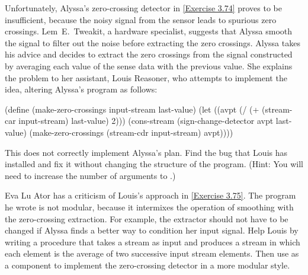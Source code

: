 \begin{exercise}
	\label{Exercise 3.75}
	Unfortunately, Alyssa’s zero-crossing detector in \cref{Exercise 3.74} proves to be insufficient, because the noisy signal from the sensor leads to spurious zero crossings.
	Lem~E.~Tweakit, a hardware specialist, suggests that Alyssa smooth the signal to filter out the noise before extracting the zero crossings.
	Alyssa takes his advice and decides to extract the zero crossings from the signal constructed by averaging each value of the sense data with the previous value.
	She explains the problem to her assistant, Louis Reasoner, who attempts to implement the idea, altering Alyssa’s program as follows:
	\begin{scheme}
	  (define (make-zero-crossings input-stream last-value)
	    (let ((avpt (/ (+ (stream-car input-stream)
	                      last-value)
	                   2)))
	      (cons-stream
	       (sign-change-detector avpt last-value)
	       (make-zero-crossings
	        (stream-cdr input-stream) avpt))))
	\end{scheme}
	This does not correctly implement Alyssa’s plan.
	Find the bug that Louis has installed and fix it without changing the structure of the program.
	(Hint:
	You will need to increase the number of arguments to .)
\end{exercise}



\begin{exercise}
	\label{Exercise 3.76}
	Eva Lu Ator has a criticism of Louis’s approach in \cref{Exercise 3.75}.
	The program he wrote is not modular, because it intermixes the operation of smoothing with the zero-crossing extraction.
	For example, the extractor should not have to be changed if Alyssa finds a better way to condition her input signal.
	Help Louis by writing a procedure  that takes a stream as input and produces a stream in which each element is the average of two successive input stream elements.
	Then use  as a component to implement the zero-crossing detector in a more modular style.
\end{exercise}
